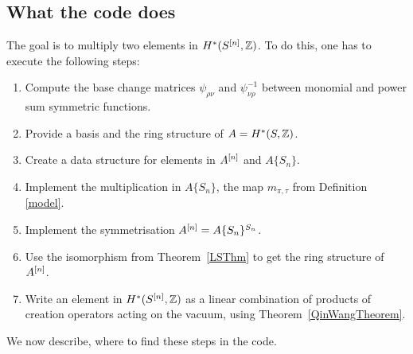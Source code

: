 \subsection{What the code does}
The goal is to multiply two elements in $H^*(S^{[n]},\mathbb{Z})$. To do this, one has to execute the following steps:
\begin{enumerate}
 \item Compute the base change matrices $\psi_{\rho\nu}$ and $\psi_{\nu\rho}^{-1}$ between monomial and power sum symmetric functions.
 \item Provide a basis and the ring structure of $A=H^*(S,\mathbb{Z})$.
 \item Create a data structure for elements in $A^{[n]}$ and $A\{S_n\}$.
 \item Implement the multiplication in $A\{S_n\}$, \ie the map $m_{\pi,\tau}$ from Definition \ref{model}.
 \item Implement the symmetrisation $A^{[n]} = A\{S_n\}^{S_n}$.
 \item Use the isomorphism from Theorem~\ref{LSThm} to get the ring structure of $A^{[n]}$.
 \item Write an element in $H^*(S^{[n]},\mathbb{Z})$ as a linear combination of products of creation operators acting on the vacuum, using Theorem~\ref{QinWangTheorem}.
\end{enumerate}
We now describe, where to find these steps in the code.
